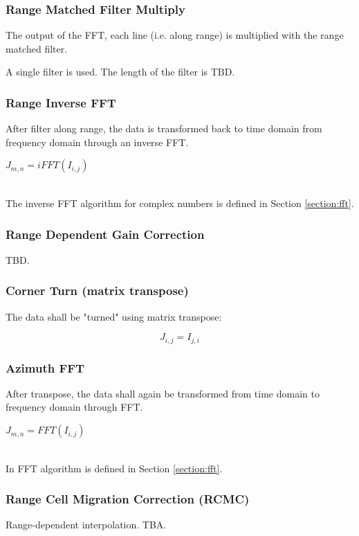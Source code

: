 \subsubsection{Range Matched Filter Multiply}
The output of the FFT, each line (i.e. along range) is multiplied with the range matched filter. 

A single filter is used. The length of the filter is TBD.

\subsubsection{Range Inverse FFT}
After filter along range, the data is transformed back to time domain from frequency domain through an inverse FFT. 

\begin{center}
\(J_{m,n} = iFFT(I_{i,j}) \)
\end{center}
\\
The inverse FFT algorithm for complex numbers is defined in Section \ref{section:fft}.

\subsubsection{Range Dependent Gain Correction}
TBD.

\subsubsection{Corner Turn (matrix transpose)}
The data shall be "turned" using matrix transpose: 

\[J_{i,j} = I_{j,i} \]

\subsubsection{Azimuth FFT}
After transpose, the data shall again be transformed from time domain to frequency domain through FFT.

\begin{center}
\(J_{m,n} = FFT(I_{i,j}) \)
\end{center}
\\
In FFT algorithm is defined in Section \ref{section:fft}.

\subsubsection{Range Cell Migration Correction (RCMC)}
Range-dependent interpolation. TBA.

